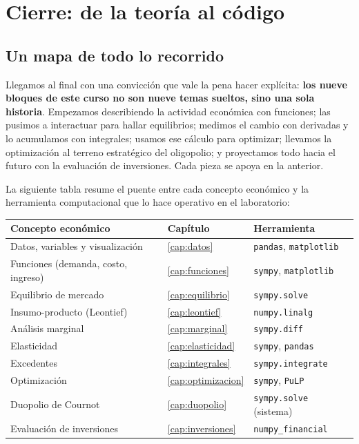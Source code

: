 \chapter{Cierre: de la teoría al código}
\label{cap:cierre}

\section{Un mapa de todo lo recorrido}

Llegamos al final con una convicción que vale la pena hacer explícita: \textbf{los nueve bloques de este curso no son nueve temas sueltos, sino una sola historia}. Empezamos describiendo la actividad económica con funciones; las pusimos a interactuar para hallar equilibrios; medimos el cambio con derivadas y lo acumulamos con integrales; usamos ese cálculo para optimizar; llevamos la optimización al terreno estratégico del oligopolio; y proyectamos todo hacia el futuro con la evaluación de inversiones. Cada pieza se apoya en la anterior.

La siguiente tabla resume el puente entre cada concepto económico y la herramienta computacional que lo hace operativo en el laboratorio:

\begin{center}
\renewcommand{\arraystretch}{1.25}
\begin{tabular}{p{5.6cm} p{3.4cm} p{4.2cm}}
\toprule
\textbf{Concepto económico} & \textbf{Capítulo} & \textbf{Herramienta} \\
\midrule
Datos, variables y visualización & \ref{cap:datos} & \texttt{pandas}, \texttt{matplotlib} \\
Funciones (demanda, costo, ingreso) & \ref{cap:funciones} & \texttt{sympy}, \texttt{matplotlib} \\
Equilibrio de mercado & \ref{cap:equilibrio} & \texttt{sympy.solve} \\
Insumo-producto (Leontief) & \ref{cap:leontief} & \texttt{numpy.linalg} \\
Análisis marginal & \ref{cap:marginal} & \texttt{sympy.diff} \\
Elasticidad & \ref{cap:elasticidad} & \texttt{sympy}, \texttt{pandas} \\
Excedentes & \ref{cap:integrales} & \texttt{sympy.integrate} \\
Optimización & \ref{cap:optimizacion} & \texttt{sympy}, \texttt{PuLP} \\
Duopolio de Cournot & \ref{cap:duopolio} & \texttt{sympy.solve} (sistema) \\
Evaluación de inversiones & \ref{cap:inversiones} & \texttt{numpy\_financial} \\
\bottomrule
\end{tabular}
\end{center}

